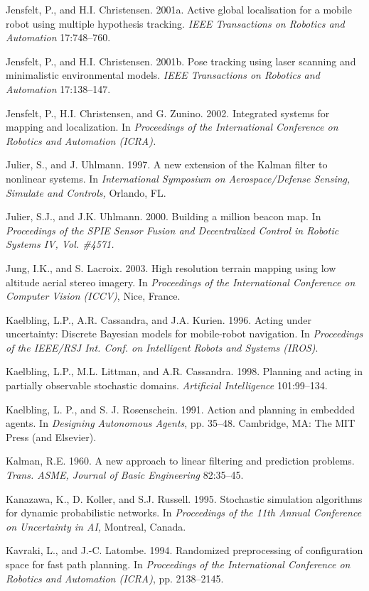 \documentclass[10pt,a4paper]{article}
\begin{document}
Jensfelt, P., and H.I. Christensen. 2001a. Active global localisation for a mobile robot
using multiple hypothesis tracking. \textit{IEEE Transactions on Robotics and Automation}
17:748–760.

Jensfelt, P., and H.I. Christensen. 2001b. Pose tracking using laser scanning and
minimalistic environmental models. \textit{IEEE Transactions on Robotics and Automation}
17:138–147.

Jensfelt, P., H.I. Christensen, and G. Zunino. 2002. Integrated systems for mapping
and localization. In \textit{Proceedings of the International Conference on Robotics and Automation
(ICRA).}

Julier, S., and J. Uhlmann. 1997. A new extension of the Kalman filter to nonlinear
systems. In \textit{International Symposium on Aerospace/Defense Sensing, Simulate and
Controls,} Orlando, FL.

Julier, S.J., and J.K. Uhlmann. 2000. Building a million beacon map. In \textit{Proceedings of
the SPIE Sensor Fusion and Decentralized Control in Robotic Systems IV, Vol. \#4571.}

Jung, I.K., and S. Lacroix. 2003. High resolution terrain mapping using low altitude
aerial stereo imagery. In \textit{Proceedings of the International Conference on Computer Vision
(ICCV)}, Nice, France.

Kaelbling, L.P., A.R. Cassandra, and J.A. Kurien. 1996. Acting under uncertainty: Discrete
Bayesian models for mobile-robot navigation. In \textit{Proceedings of the IEEE/RSJ
Int. Conf. on Intelligent Robots and Systems (IROS)}.

Kaelbling, L.P., M.L. Littman, and A.R. Cassandra. 1998. Planning and acting in
partially observable stochastic domains. \textit{Artificial Intelligence} 101:99–134.

Kaelbling, L. P., and S. J. Rosenschein. 1991. Action and planning in embedded agents.
In \textit{Designing Autonomous Agents}, pp. 35–48. Cambridge, MA: The MIT Press (and
Elsevier).

Kalman, R.E. 1960. A new approach to linear filtering and prediction problems.
\textit{Trans. ASME, Journal of Basic Engineering} 82:35–45.

Kanazawa, K., D. Koller, and S.J. Russell. 1995. Stochastic simulation algorithms
for dynamic probabilistic networks. In \textit{Proceedings of the 11th Annual Conference on
Uncertainty in AI,} Montreal, Canada.

Kavraki, L., and J.-C. Latombe. 1994. Randomized preprocessing of configuration
space for fast path planning. In \textit{Proceedings of the International Conference on Robotics
and Automation (ICRA)}, pp. 2138–2145.
\end{document}
